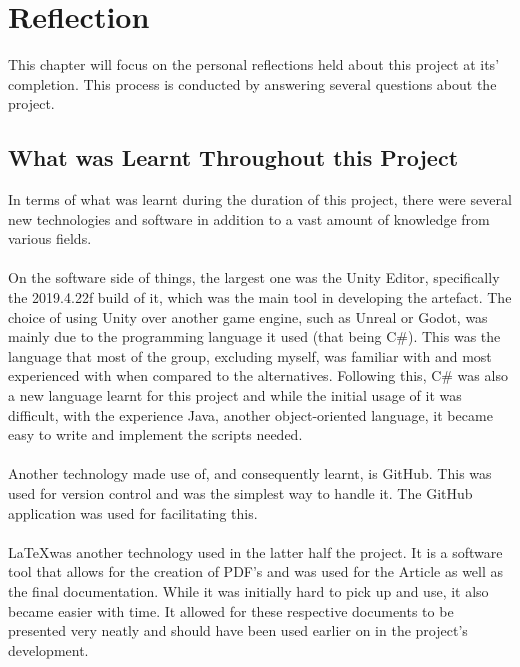 
\chapter{Reflection} %

\label{Chapter5} %
This chapter will focus on the personal reflections held about this project at its' completion. This process is conducted by answering several questions about the project.

\section{What was Learnt Throughout this Project}
In terms of what was learnt during the duration of this project, there were several new technologies and software in addition to a vast amount of knowledge from various fields.
\\\\
On the software side of things, the largest one was the Unity Editor, specifically the 2019.4.22f build of it, which was the main tool in developing the artefact. The choice of using Unity over another game engine, such as Unreal or Godot, was mainly due to the programming language it used (that being C\#). This was the language that most of the group, excluding myself, was familiar with and most experienced with when compared to the alternatives. Following this, C\# was also a new language learnt for this project and while the initial usage of it was difficult, with the experience  Java, another object-oriented language, it became easy to write and implement the scripts needed. 
\\\\
Another technology made use of, and consequently learnt, is GitHub. This was used for version control and was the simplest way to handle it. The GitHub application was used for facilitating this. 
\\\\
\LaTeX was another technology used in the latter half the project. It is a software tool that allows for the creation of PDF's and was used for the Article as well as the final documentation. While it was initially hard to pick up and use, it also became easier with time. It allowed for these respective documents to be presented very neatly and should have been used earlier on in the project's development. 
\\\\

